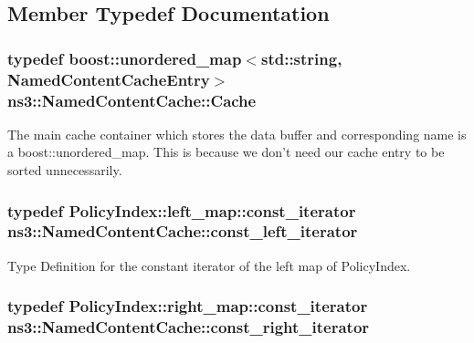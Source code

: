 \subsection{Member Typedef Documentation}
\hypertarget{classns3_1_1NamedContentCache_a9aa35d883b9f4153d97b6e7dc74f9307}{
\subsubsection[{Cache}]{\setlength{\rightskip}{0pt plus 5cm}typedef boost\-::unordered\-\_\-map$<$std\-::string, {\bf Named\-Content\-Cache\-Entry}$>$ {\bf ns3\-::\-Named\-Content\-Cache\-::\-Cache}}}\label{classns3_1_1NamedContentCache_a9aa35d883b9f4153d97b6e7dc74f9307}


The main cache container which stores the data buffer and corresponding name is a boost\-::unordered\-\_\-map. This is because we don't need our cache entry to be sorted unnecessarily. 

\hypertarget{classns3_1_1NamedContentCache_a061b957fbf37ee4eb873db49705bc388}{
\subsubsection[{const\-\_\-left\-\_\-iterator}]{\setlength{\rightskip}{0pt plus 5cm}typedef Policy\-Index\-::left\-\_\-map\-::const\-\_\-iterator {\bf ns3\-::\-Named\-Content\-Cache\-::const\-\_\-left\-\_\-iterator}}}\label{classns3_1_1NamedContentCache_a061b957fbf37ee4eb873db49705bc388}


Type Definition for the constant iterator of the left map of Policy\-Index. 

\hypertarget{classns3_1_1NamedContentCache_a7489e77c6528954d887b8ff107a1244f}{
\subsubsection[{const\-\_\-right\-\_\-iterator}]{\setlength{\rightskip}{0pt plus 5cm}typedef Policy\-Index\-::right\-\_\-map\-::const\-\_\-iterator {\bf ns3\-::\-Named\-Content\-Cache\-::const\-\_\-right\-\_\-iterator}}}\label{classns3_1_1NamedContentCache_a7489e77c6528954d887b8ff107a1244f}


